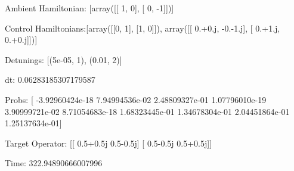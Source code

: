 \documentclass{article}
\begin{document}
    

\newpage

Ambient Hamiltonian: [array([[ 1,  0],
       [ 0, -1]])]

Control Hamiltonians:[array([[0, 1],
       [1, 0]]), array([[ 0.+0.j, -0.-1.j],
       [ 0.+1.j,  0.+0.j]])]

Detunings: [(5e-05, 1), (0.01, 2)]

 dt: 0.06283185307179587

Probs: [ -3.92960424e-18   7.94994536e-02   2.48809327e-01   1.07796010e-19
   3.90999721e-02   8.71054683e-18   1.68323445e-01   1.34678304e-01
   2.04451864e-01   1.25137634e-01]

Target Operator: [[ 0.5+0.5j  0.5-0.5j]
 [ 0.5-0.5j  0.5+0.5j]]

Time: 322.94890666007996
\end{document}
